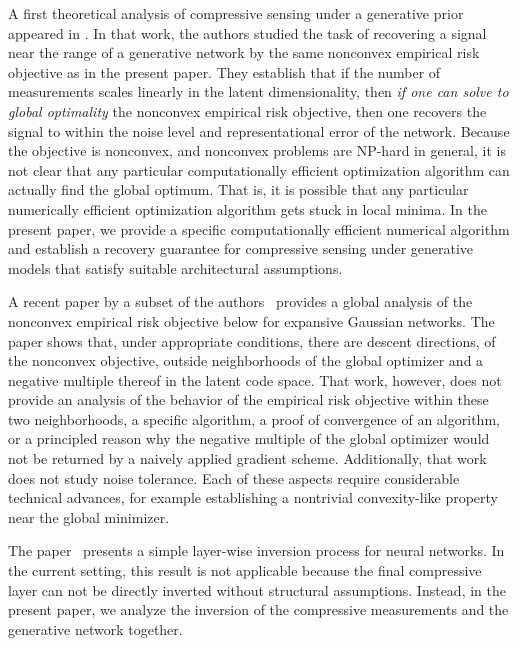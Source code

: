 A first theoretical analysis of compressive sensing under a generative prior appeared in \cite{BJPD2017}.  In that work, the authors studied the task of recovering a signal near the range of a generative network by the same nonconvex empirical risk objective as in the present paper.  They establish that if the number of measurements scales linearly in the latent dimensionality, then \textit{if one can solve to global optimality}  the nonconvex empirical risk objective, then one recovers the signal to within the noise level and representational error of the network.  Because the objective is nonconvex, and nonconvex problems are NP-hard in general, it is not clear that any particular computationally efficient optimization algorithm can actually find the global optimum.  That is, it is possible that any particular numerically efficient optimization algorithm gets stuck in local minima. In the present paper, we provide a specific computationally efficient numerical algorithm and establish a recovery guarantee for compressive sensing under generative models that satisfy suitable architectural assumptions.

A recent paper by a subset of the authors~\cite{HV17} provides a global analysis of the nonconvex empirical risk objective below for expansive Gaussian networks.
The paper shows that, under appropriate conditions, there are descent directions, of the nonconvex objective, outside neighborhoods of the global optimizer and a negative multiple thereof in the latent code space. That work, however, does not provide an analysis of the behavior of the empirical risk objective within these two neighborhoods, a specific algorithm, a proof of convergence of an algorithm, or a principled reason why the negative multiple of the global optimizer would not be returned by a naively applied gradient scheme.  Additionally, that work does not study noise tolerance.  Each of these aspects require considerable technical advances, for example establishing a nontrivial convexity-like property near the global minimizer.

The paper~\cite{ALM2015} presents a simple layer-wise inversion process for neural networks.  In the current setting, this result is not applicable because the final compressive layer can not be directly inverted without structural assumptions.  Instead, in the present paper, we analyze the inversion of the compressive measurements and the generative network together.


